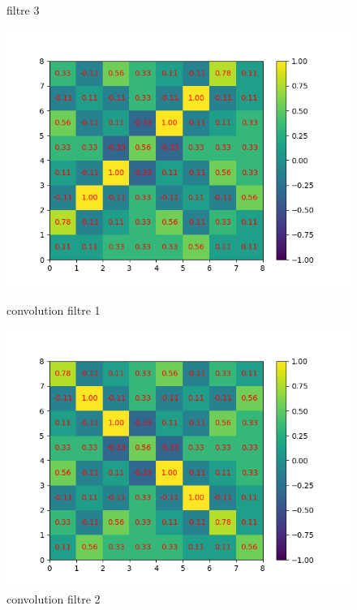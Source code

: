 \begin{figure}[!htb]
        \caption{filtre 3}
    \endminipage
\end{figure}

\newpage

\begin{figure}[h]
        \includegraphics[width=\textwidth]{img/cnn_exemple/cross/convolution_filtre_1.png}
        \caption{convolution filtre 1}
    \endminipage\hfill
        \includegraphics[width=\textwidth]{img/cnn_exemple/cross/convolution_filtre_2.png}
        \caption{convolution filtre 2}
    \endminipage\hfill

\end{figure}
